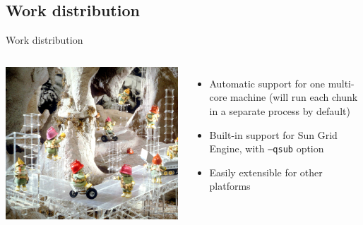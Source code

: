 \documentclass{beamer}
\begin{document}
\subsection{Work distribution}

\begin{frame}{Work distribution}
  \begin{columns}
    \column{2in}
    \includegraphics[scale=0.8]{doozers.jpg}    
    \column{3in}
    \begin{itemize}
    \item Automatic support for one multi-core machine (will run each chunk in a separate process by default)
    \item Built-in support for Sun Grid Engine, with \texttt{--qsub} option
    \item Easily extensible for other platforms
    \end{itemize}
  \end{columns}
\end{frame}
\end{document}
